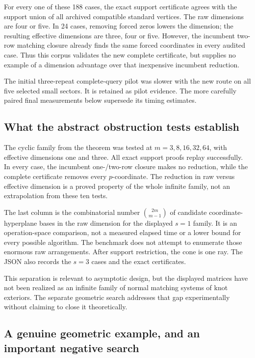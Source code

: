 For every one of these 188 cases, the exact support certificate agrees
with the support union of all archived compatible standard vertices.
The raw dimensions are four or five. In 24 cases, removing forced zeros
lowers the dimension; the resulting effective dimensions are three,
four or five. However, the incumbent two-row matching closure already
finds the same forced coordinates in every audited case. Thus this
corpus validates the new complete certificate, but supplies no example
of a dimension advantage over that inexpensive incumbent reduction.

The initial three-repeat complete-query pilot was slower with the
new route on all five selected small sectors. It is retained as pilot
evidence. The more carefully paired final measurements below supersede
its timing estimates.

\subsection{What the abstract obstruction tests establish}

The cyclic family from the theorem was tested at
\(m=3,8,16,32,64\), with effective dimensions one and three. All exact
support proofs replay successfully. In every case, the incumbent
one-/two-row closure makes no reduction, while the complete certificate
removes every \(p\)-coordinate. The reduction in raw versus effective
dimension is a proved property of the whole infinite family, not an
extrapolation from these ten tests.



The last column is the combinatorial number
\(\binom{2m}{m-1}\) of candidate coordinate-hyperplane bases in the raw
dimension for the displayed \(s=1\) family. It is an operation-space
comparison, not a measured elapsed time or a lower bound for every
possible algorithm. The benchmark does not attempt to enumerate those
enormous raw arrangements. After support restriction, the cone is one
ray. The JSON also records the \(s=3\) cases and the exact certificates.

This separation is relevant to asymptotic design, but the displayed
matrices have not been realized as an infinite family of normal matching
systems of knot exteriors. The separate geometric search addresses that
gap experimentally without claiming to close it theoretically.

\subsection{A genuine geometric example, and an important negative search}

